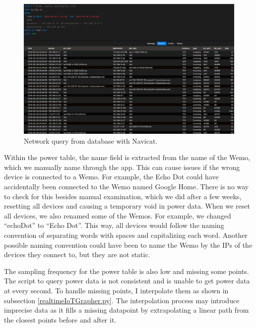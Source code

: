 \begin{figure}[H]
    \centering
    \includegraphics[width=1\textwidth]{figures/navicatNetworkQuery.png}
    \caption{Network query from database with Navicat.}
    \label{fig:navicatNetworkQuery}
\end{figure}
Within the power table, the name field is extracted from the name of the Wemo, which we manually name through the app. This can cause issues if the wrong device is connected to a Wemo. For example, the Echo Dot could have accidentally been connected to the Wemo named Google Home. There is no way to check for this besides manual examination, which we did after a few weeks, resetting all devices and causing a temporary void in power data. When we reset all devices, we also renamed some of the Wemos. For example, we changed ``echoDot'' to ``Echo Dot''. This way, all devices would follow the naming convention of separating words with spaces and capitalizing each word. Another possible naming convention could have been to name the Wemo by the IPs of the devices they connect to, but they are not static.

The sampling frequency for the power table is also low and missing some points. The script to query power data is not consistent and is unable to get power data at every second. To handle missing points, I interpolate them as shown in subsection \ref{realtimeIoTGrapher.py}. The interpolation process may introduce imprecise data as it fills a missing datapoint by extrapolating a linear path from the closest points before and after it.

